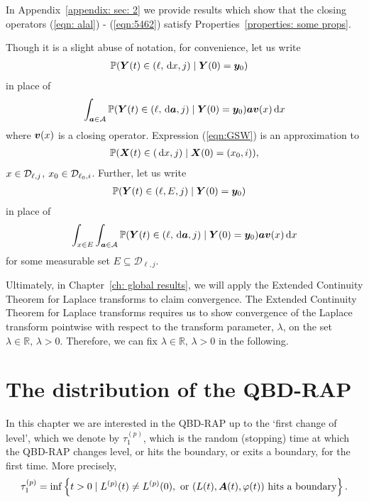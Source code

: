 In Appendix~\ref{appendix: sec: 2} we provide results which show that the closing operators (\ref{eqn: alal}) - (\ref{eqn:5462}) satisfy Properties~\ref{properties: some props}. 

Though it is a slight abuse of notation, for convenience, let us write 
\begin{align*}
	& \mathbb P({\boldsymbol Y}(t) \in (\ell,\, \mathrm{d} x, j)\mid \boldsymbol Y(0)=\boldsymbol y_0 )
\end{align*}
in place of 
\begin{align}
	\int_{\boldsymbol a \in\mathcal A}\mathbb P({\boldsymbol Y}(t) \in (\ell,\, \mathrm{d} \boldsymbol a, j)\mid \boldsymbol Y(0)=\boldsymbol y_0)\boldsymbol a\boldsymbol v(x)\, \mathrm{d} x \label{eqn:GSW}
\end{align}
where \(\boldsymbol v(x)\) is a closing operator. Expression (\ref{eqn:GSW}) is an approximation to 
\begin{align}
	\mathbb P(\boldsymbol X(t)\in(\, \mathrm{d} x, j)\mid \boldsymbol X(0)=(x_0, i)),
\end{align}
\(x\in \mathcal{D}_{\ell,j}\), \(x_0\in\mathcal{D}_{\ell_0,i}\).
Further, let us write 
\begin{align*}
	& \mathbb P({\boldsymbol Y} (t) \in (\ell,E, j)\mid \boldsymbol Y (0)=\boldsymbol y_0 )
\end{align*}
in place of 
\begin{align}
	\int_{x\in E}\int_{\boldsymbol a \in\mathcal A}\mathbb P({\boldsymbol Y} (t) \in (\ell,\, \mathrm{d} \boldsymbol a, j)\mid \boldsymbol Y (0)=\boldsymbol y_0  )\boldsymbol a\boldsymbol v(x)\, \mathrm{d} x \label{eqn:GSW2}
\end{align}
for some measurable set \(E\subseteq \mathcal D_{\ell,j}\). 

Ultimately, in Chapter~\ref{ch: global results}, we will apply the Extended Continuity Theorem for Laplace transforms \cite[Chapter XIII, Theorem 2a]{feller1957} to claim convergence. The Extended Continuity Theorem for Laplace transforms requires us to show convergence of the Laplace transform pointwise with respect to the transform parameter, \(\lambda\), on the set \(\lambda\in\mathbb R,\, \lambda>0\). Therefore, we can fix \(\lambda\in\mathbb R,\, \lambda>0\) in the following. 

\section{The distribution of the QBD-RAP}\label{sec: qbd dists}
In this chapter we are interested in the QBD-RAP up to the `first change of level', which we denote by \(\tau_1^{(p)}\), which is the random (stopping) time at which the QBD-RAP changes level, or hits the boundary, or exits a boundary, for the first time. More precisely, 
\[\tau_1^{(p)} = \inf\left\{t>0\mid L^{(p)}(t)\neq L^{(p)}(0),\mbox{ or }(L(t),\boldsymbol A(t),\varphi(t))\mbox{ hits a boundary}\right\}.\]

